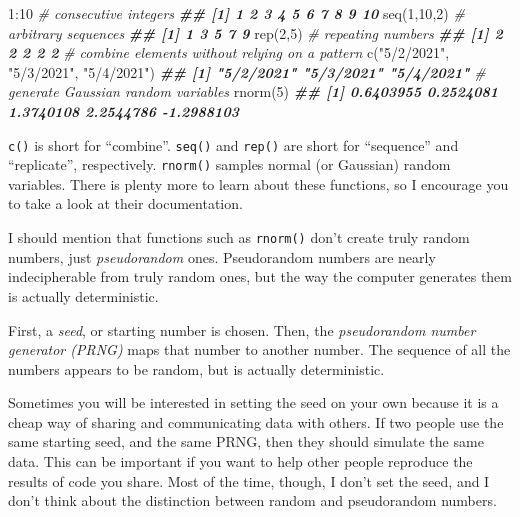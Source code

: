 \documentclass[
  12pt,
  krantz2]{krantz}
\makeatletter
\newenvironment{Shaded}{\begin{snugshade}}{\end{snugshade}}
\newcommand{\CommentTok}[1]{\textcolor[rgb]{0.37,0.37,0.37}{\textit{#1}}}
\newcommand{\DecValTok}[1]{\textcolor[rgb]{0.06,0.06,0.06}{#1}}
\newcommand{\DocumentationTok}[1]{\textcolor[rgb]{0.37,0.37,0.37}{\textbf{\textit{#1}}}}
\newcommand{\FunctionTok}[1]{\textcolor[rgb]{0,0,0}{#1}}
\newcommand{\NormalTok}[1]{#1}
\newcommand{\SpecialCharTok}[1]{\textcolor[rgb]{0,0,0}{#1}}
\newcommand{\StringTok}[1]{\textcolor[rgb]{0.5,0.5,0.5}{#1}}
\newenvironment{kframe}{%
\medskip{}
\setlength{\fboxsep}{.8em}
 \def\at@end@of@kframe{}%
 \ifinner\ifhmode%
  \def\at@end@of@kframe{\end{minipage}}%
  \begin{minipage}{\columnwidth}%
 \fi\fi%
 \def\FrameCommand##1{\hskip\@totalleftmargin \hskip-\fboxsep
 \colorbox{shadecolor}{##1}\hskip-\fboxsep
     \hskip-\linewidth \hskip-\@totalleftmargin \hskip\columnwidth}%
 \MakeFramed {\advance\hsize-\width
   \@totalleftmargin\z@ \linewidth\hsize
   \@setminipage}}%
 {\par\unskip\endMakeFramed%
 \at@end@of@kframe}
\renewenvironment{Shaded}{\begin{kframe}}{\end{kframe}}
\makeatother
\begin{document}
\begin{Shaded}
\begin{Highlighting}[]
\DecValTok{1}\SpecialCharTok{:}\DecValTok{10}         \CommentTok{\# consecutive integers}
\DocumentationTok{\#\#  [1]  1  2  3  4  5  6  7  8  9 10}
\FunctionTok{seq}\NormalTok{(}\DecValTok{1}\NormalTok{,}\DecValTok{10}\NormalTok{,}\DecValTok{2}\NormalTok{)  }\CommentTok{\# arbitrary sequences}
\DocumentationTok{\#\# [1] 1 3 5 7 9}
\FunctionTok{rep}\NormalTok{(}\DecValTok{2}\NormalTok{,}\DecValTok{5}\NormalTok{)     }\CommentTok{\# repeating numbers}
\DocumentationTok{\#\# [1] 2 2 2 2 2}
\CommentTok{\# combine elements without relying on a pattern}
\FunctionTok{c}\NormalTok{(}\StringTok{"5/2/2021"}\NormalTok{, }\StringTok{"5/3/2021"}\NormalTok{, }\StringTok{"5/4/2021"}\NormalTok{) }
\DocumentationTok{\#\# [1] "5/2/2021" "5/3/2021" "5/4/2021"}
\CommentTok{\# generate Gaussian random variables}
\FunctionTok{rnorm}\NormalTok{(}\DecValTok{5}\NormalTok{)                             }
\DocumentationTok{\#\# [1]  0.6403955  0.2524081  1.3740108  2.2544786 {-}1.2988103}
\end{Highlighting}
\end{Shaded}

\texttt{c()} is short for ``combine''. \texttt{seq()} and \texttt{rep()} are short for ``sequence'' and ``replicate'', respectively. \texttt{rnorm()} samples normal (or Gaussian) random variables. There is plenty more to learn about these functions, so I encourage you to take a look at their documentation.

\begin{rmd-details}
I should mention that functions such as \texttt{rnorm()} don't create truly random numbers, just \emph{pseudorandom} ones. Pseudorandom numbers are nearly indecipherable from truly random ones, but the way the computer generates them is actually deterministic.

First, a \emph{seed}, or starting number is chosen. Then, the \emph{pseudorandom number generator (PRNG)} maps that number to another number. The sequence of all the numbers appears to be random, but is actually deterministic.

Sometimes you will be interested in setting the seed on your own because it is a cheap way of sharing and communicating data with others. If two people use the same starting seed, and the same PRNG, then they should simulate the same data. This can be important if you want to help other people reproduce the results of code you share. Most of the time, though, I don't set the seed, and I don't think about the distinction between random and pseudorandom numbers.

\end{rmd-details}
\end{document}
